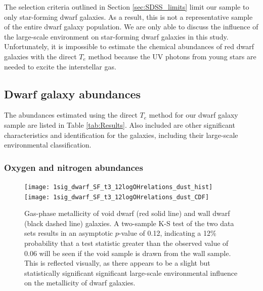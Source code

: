 The selection criteria outlined in Section \ref{sec:SDSS_limits} limit our 
sample to only star-forming dwarf galaxies.  As a result, this is not a 
representative sample of the entire dwarf galaxy population.  We are only able 
to discuss the influence of the large-scale environment on star-forming dwarf 
galaxies in this study.  Unfortunately, it is impossible to estimate the 
chemical abundances of red dwarf galaxies with the direct $T_e$ method because 
the UV photons from young stars are needed to excite the interstellar gas.


\subsection{Dwarf galaxy abundances}

\floattable


The abundances estimated using the direct $T_e$ method for our dwarf galaxy 
sample are listed in Table \ref{tab:Results}.  Also included are other 
significant characteristics and identification for the galaxies, including their 
large-scale environmental classification.


\subsubsection{Oxygen and nitrogen abundances}

\begin{figure}
    \centering
    \texttt{[image: 1sig\_dwarf\_SF\_t3\_12logOHrelations\_dust\_hist]}
    \texttt{[image: 1sig\_dwarf\_SF\_t3\_12logOHrelations\_dust\_CDF]}
    \caption{Gas-phase metallicity of void dwarf (red solid line) and wall 
    dwarf (black dashed line) galaxies.  A two-sample K-S test of the two data 
    sets results in an asymptotic $p$-value of 0.12, indicating a 12\% 
    probability that a test statistic greater than the observed value of 0.06 
    will be seen if the void sample is drawn from the wall sample.  This is 
    reflected visually, as there appears to be a slight but statistically 
    significant significant large-scale environmental influence on the 
    metallicity of dwarf galaxies.}
    \label{fig:met1sig}
\end{figure}

